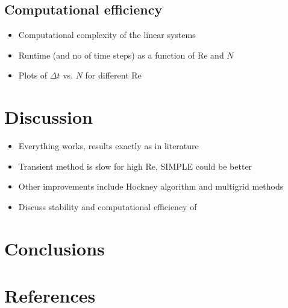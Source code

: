 \documentclass[final,3p,twocolumn]{elsarticle}
\begin{document}
\subsection{Computational efficiency}
\label{subsec:efficiency}

\begin{itemize}
    \item Computational complexity of the linear systems
    \item Runtime (and no of time steps) as a function of Re and $N$
    \item Plots of $\Delta t$ vs. $N$ for different Re 
\end{itemize}

\section{Discussion}
\label{sec:discussion}

\begin{itemize}
    \item Everything works, results exactly as in literature
    \item Transient method is slow for high Re, SIMPLE could be better
    \item Other improvements include Hockney algorithm and multigrid methods
    \item Discuss stability and computational efficiency of
\end{itemize}

\section{Conclusions}
\label{sec:conclusion}


\section*{References}


\end{document}
